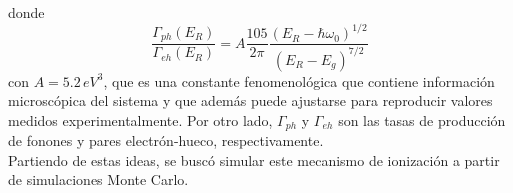 donde 
\begin{equation*}
    \frac{\Gamma_{ph}(E_{R})}{\Gamma_{eh}(E_{R})}
    = A\frac{105}{2\pi}\frac{(E_{R} - \hbar \omega_{0})^{1/2}}{(E_{R} - E_{g})^{7/2}}
\end{equation*}
con $A = 5.2\,\si{eV^{3}}$, que es una constante fenomenológica que contiene información microscópica del sistema y que además puede ajustarse para reproducir valores medidos experimentalmente. Por otro lado, $\Gamma_{ph}$ y $\Gamma_{eh}$ son las tasas de producción de fonones y pares electrón-hueco, respectivamente.\\
\indent Partiendo de estas ideas, se buscó simular este mecanismo de ionización a partir de simulaciones Monte Carlo.
